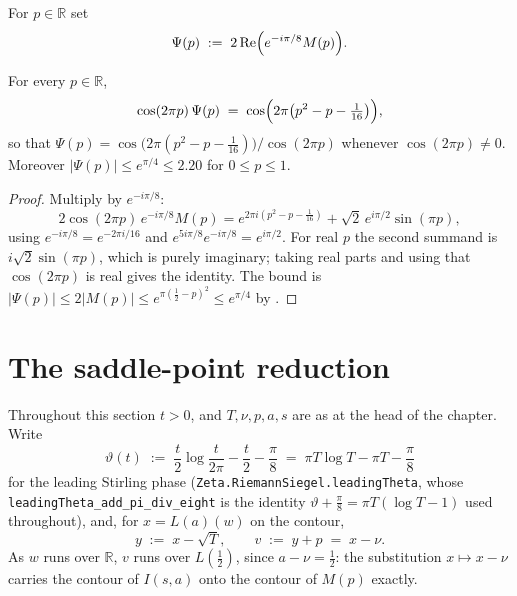 \begin{definition}
\label{def:rsf_correction}
\leanok
{}
For $p\in\mathbb{R}$ set
\[
  \Psi(p)\;:=\;2\operatorname{Re}\Bigl(e^{-i\pi/8}M(p)\Bigr).
\]
\end{definition}

\begin{corollary}
\label{cor:rsf_correction_closed}
\leanok
{}
For every $p\in\mathbb{R}$,
\[
  \cos(2\pi p)\,\Psi(p)\;=\;\cos\Bigl(2\pi\bigl(p^{2}-p-\tfrac1{16}\bigr)\Bigr),
\]
so that $\Psi(p)=\cos\bigl(2\pi(p^{2}-p-\tfrac1{16})\bigr)/\cos(2\pi p)$ whenever
$\cos(2\pi p)\ne0$.  Moreover $\lvert\Psi(p)\rvert\le e^{\pi/4}\le2.20$ for $0\le p\le1$.
\end{corollary}

\begin{proof}
\leanok
{}
Multiply  by $e^{-i\pi/8}$:
\[
  2\cos(2\pi p)\,e^{-i\pi/8}M(p)
  =e^{2\pi i\left(p^{2}-p-\frac1{16}\right)}+\sqrt2\,e^{i\pi/2}\sin(\pi p),
\]
using $e^{-i\pi/8}=e^{-2\pi i/16}$ and $e^{5i\pi/8}e^{-i\pi/8}=e^{i\pi/2}$.  For real $p$ the
second summand is $i\sqrt2\sin(\pi p)$, which is purely imaginary; taking real parts and using
that $\cos(2\pi p)$ is real gives the identity.  The bound is
$\lvert\Psi(p)\rvert\le2\lvert M(p)\rvert\le e^{\pi\left(\frac12-p\right)^{2}}\le e^{\pi/4}$ by
.
\end{proof}

\section{The saddle-point reduction}
\label{sec:rsf_saddle}

Throughout this section $t>0$, and $T,\nu,p,a,s$ are as at the head of the chapter.  Write
\[
  \vartheta(t)\;:=\;\frac t2\log\frac t{2\pi}-\frac t2-\frac\pi8
  \;=\;\pi T\log T-\pi T-\frac\pi8
\]
for the leading Stirling phase (\texttt{Zeta.RiemannSiegel.leadingTheta}, whose
\texttt{leadingTheta\_add\_pi\_div\_eight} is the identity $\vartheta+\tfrac\pi8=\pi T(\log T-1)$
used throughout), and, for $x=L(a)(w)$ on the contour,
\[
  y\;:=\;x-\sqrt T,\qquad v\;:=\;y+p\;=\;x-\nu .
\]
As $w$ runs over $\mathbb{R}$, $v$ runs over $L(\tfrac12)$, since $a-\nu=\tfrac12$: the
substitution $x\mapsto x-\nu$ carries the contour of $I(s,a)$ onto the contour of $M(p)$
exactly.

